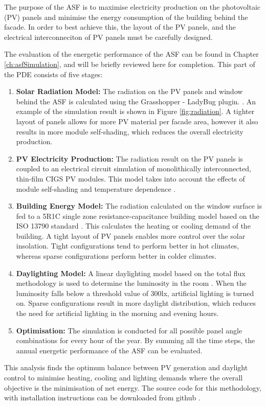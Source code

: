 The purpose of the ASF is to maximise electricity production on the photovoltaic (PV) panels and minimise the energy consumption of the building behind the facade. In order to best achieve this, the layout of the PV panels, and the electrical interconneciton of PV panels must be carefully designed.

The evaluation of the energetic performance of the ASF can be found in Chapter \ref{ch:asfSimulation}, and will be briefly reviewed here for completion. This part of the PDE consists of five stages: 

\begin{enumerate}
\item \textbf{Solar Radiation Model:} The radiation on the PV panels and window behind the ASF is calculated using the Grasshopper - LadyBug plugin.  \cite{roudsari2013ladybug}. An example of the simulation result is shown in Figure \ref{fig:radiation}. A tighter layout of panels allows for more PV material per facade area, however it also results in more module self-shading, which reduces the overall electricity production.
\item \textbf{PV Electricity Production:} The radiation result on the PV panels is coupled to an electrical circuit simulation of monolithically interconnected, thin-film CIGS PV modules. This model takes into account the effects of module self-shading and temperature dependence \cite{hofer2016parametric}. 
\item \textbf{Building Energy Model:} The radiation calculated on the window surface is fed to a 5R1C single zone resistance-capacitance building model based on the ISO 13790 standard \cite{de2008iso}. This calculates the heating or cooling demand of the building. A tight layout of PV panels enables more control over the solar insolation. Tight configurations tend to perform better in hot climates, whereas sparse configurations perform better in colder climates. 
\item \textbf{Daylighting Model:} A linear daylighting model based on the total flux methodology is used to determine the luminosity in the room \cite{szokolay1980handbook}. When the luminosity falls below a threshold value of 300lx, artificial lighting is turned on. Sparse configurations result in more daylight distribution, which reduces the need for artificial lighting in the morning and evening hours.
\item \textbf{Optimisation:} The simulation is conducted for all possible panel angle combinations for every hour of the year. By summing all the time steps, the annual energetic performance of the ASF can be evaluated. 
\end{enumerate}
This analysis finds the optimum balance between PV generation and daylight control to minimise heating, cooling and lighting demands where the overall objective is the minimisation of net energy.
The source code for this methodology, with installation instructions can be downloaded from github \cite{ASFGitHub,RCGitHub}.

